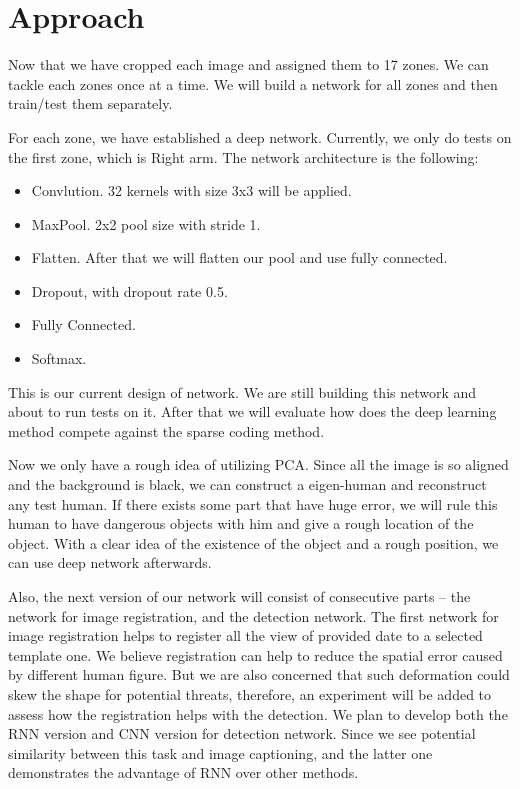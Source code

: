 \documentclass[conference,compsoc]{IEEEtran}
\begin{document}
\section{Approach}
	\par Now that we have cropped each image and assigned them to 17 zones. We can tackle each zones once at a time. We will build a network for all zones and then train/test them separately.
	\par For each zone, we have established a deep network. Currently, we only do tests on the first zone, which is Right arm. The network architecture is the following:
	\begin{itemize}
		\item Convlution. 32 kernels with size 3x3 will be applied. 
		\item MaxPool.  2x2 pool size with stride 1.
		\item Flatten. After that we will flatten our pool and use fully connected.
		\item Dropout, with dropout rate 0.5.
		\item Fully Connected.
		\item Softmax.
	\end{itemize}
	\par This is our current design of network. We are still building this network and about to run tests on it. After that we will evaluate how does the deep learning method compete against the sparse coding method.
	\par Now we only have a rough idea of utilizing PCA. Since all the image is so aligned and the background is black, we can construct a eigen-human and reconstruct any test human. If there exists some part that have huge error, we will rule this human to have dangerous objects with him and give a rough location of the object. With a clear idea of the existence of the object and a rough position, we can use deep network afterwards.
	\par Also, the next version of our network will consist of consecutive parts -- the network for image registration, and the detection network. The first network for image registration helps to register all the view of provided date to a selected template one. We believe registration can help to reduce the spatial error caused by different human figure. But we are also concerned that such deformation could skew the shape for potential threats, therefore, an experiment will be added to assess how the registration helps with the detection. We plan to develop both the RNN version and CNN version for detection network. Since we see potential similarity between this task and image captioning, and the latter one demonstrates the advantage of RNN over other methods.

% 
\end{document}
